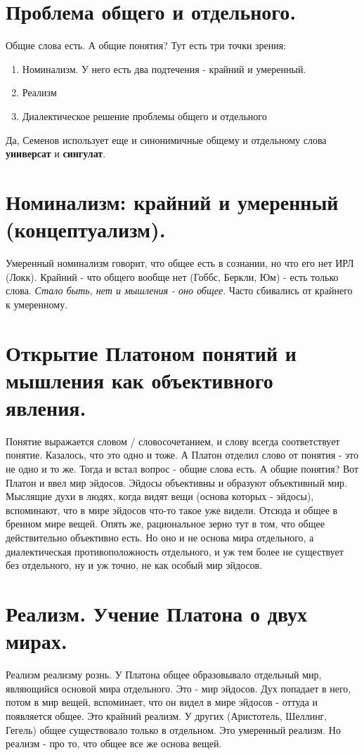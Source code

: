 \section{ Проблема общего и отдельного.}
Общие слова есть. А общие понятия? Тут есть три точки зрения:
\begin{enumerate}
\item Номинализм. У него есть два подтечения - крайний и умеренный.
\item Реализм
\item Диалектическое решение проблемы общего и отдельного
\end{enumerate}
Да, Семенов  использует еще и синонимичные общему и отдельному слова \textbf{универсат} и \textbf{сингулат}.

\section{ Номинализм: крайний и умеренный (концептуализм).}
Умеренный номинализм говорит, что общее есть в сознании, но что его нет ИРЛ (Локк). Крайний - что общего вообще нет (Гоббс, Беркли, Юм) - есть только слова. \textit{Стало быть, нет и мышления - оно общее}. Часто сбивались от крайнего к умеренному.

\section{ Открытие Платоном понятий и мышления как объективного явления.}
Понятие выражается словом / словосочетанием, и слову всегда соответствует понятие. Казалось, что это одно и тоже. А Платон отделил слово от понятия - это не одно и то же. Тогда и встал вопрос -  общие слова есть. А общие понятия? Вот Платон и ввел мир эйдосов. Эйдосы объективны и образуют объективный мир. Мыслящие духи в людях, когда видят вещи (основа которых - эйдосы), вспоминают, что в мире эйдосов что-то такое уже видели. Отсюда и общее в бренном мире вещей. Опять же, рациональное зерно тут в том, что общее действительно объективно есть. Но оно и не основа мира отдельного, а диалектическая противоположность отдельного, и уж тем более не существует без отдельного, ну и уж точно, не  как особый мир эйдосов. 

\section{ Реализм. Учение Платона о двух мирах.}
Реализм реализму рознь. У Платона общее образовывало отдельный мир, являющийся основой мира отдельного. Это - мир эйдосов. Дух попадает в него, потом в мир вещей, вспоминает, что он видел в мире эйдосов - оттуда и появляется общее. Это крайний реализм. У других (Аристотель, Шеллинг, Гегель) общее существовало только в отдельном. Это умеренный реализм. Но реализм - про то, что общее все же основа вещей.

